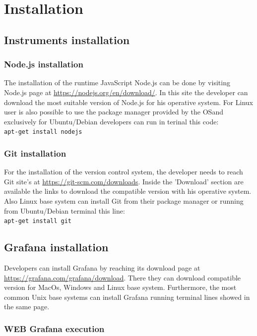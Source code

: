 \section{Installation}

\subsection{Instruments installation}

\subsubsection{Node.js installation}
The installation of the runtime JavaScript Node.js can be done by visiting  Node.js page at \url{https://nodejs.org/en/download/}. In this site the developer can download the most suitable version of Node.js for his operative system. For Linux user is also possible to use the package manager provided by the OS\glo and exclusively for Ubuntu/Debian developers can run in terinal this code:\\
\texttt{apt-get install nodejs} \\

\subsubsection{Git installation}
For the installation of the version control system, the developer needs to reach Git site's at \url{https://git-scm.com/downloads}. Inside the 'Download' section are available the links to download the compatible version with his operative system. Also Linux base system  can install Git from their package manager or running from Ubuntu/Debian terminal this line:\\
\texttt{apt-get install git} \\

\subsection{Grafana installation}
Developers can install Grafana by reaching its download page at \url{https://grafana.com/grafana/download}. There they can download compatible version for MacOs, Windows and Linux base system. Furthermore, the most common Unix base systems can install Grafana running terminal lines showed in the same page.

\subsubsection{WEB Grafana execution}

